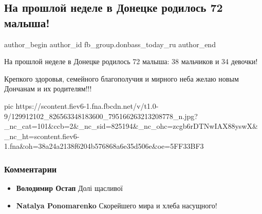  
 
 
 
 
 
\subsection{На прошлой неделе в Донецке родилось 72 малыша!}
\label{sec:07_12_2020.fb.fb_group.donbass_today_ru.4.deti_rodilis}
\ifcmt
	author_begin
   author_id fb_group.donbass_today_ru
	author_end
\fi

На прошлой неделе в Донецке родилось 72 малыша: 38 мальчиков и 34 девочки!

Крепкого здоровья, семейного благополучия и мирного неба желаю новым Дончанам и
их родителям!!!

\ifcmt
pic https://scontent.fiev6-1.fna.fbcdn.net/v/t1.0-9/129912102_826563348183600_795166263213208778_n.jpg?_nc_cat=101&ccb=2&_nc_sid=825194&_nc_ohc=zcgb6rDTNwIAX88yswX&_nc_ht=scontent.fiev6-1.fna&oh=38a24a2138f6204b576868a6e35d506e&oe=5FF33BF3
\fi

\subsubsection{Комментарии}

\begin{itemize}
\item \textbf{Володимир Остап}
Долі щасливої

\item \textbf{Natalya Ponomarenko}
Скорейшего мира и хлеба насущного!
\end{itemize}
